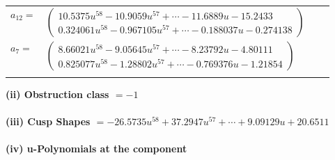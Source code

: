 \documentclass[1p]{elsarticle_modified}
\theoremstyle{definition}
\begin{document}
\begin{tabular}{m{7pt} m{180pt} m{7pt} m{180pt} }
\flushright $a_{12}=$&$\begin{pmatrix}10.5375 u^{58}-10.9059 u^{57}+\cdots-11.6889 u-15.2433\\0.324061 u^{58}-0.967105 u^{57}+\cdots-0.188037 u-0.274138\end{pmatrix}$ \\
\flushright $a_{7}=$&$\begin{pmatrix}8.66021 u^{58}-9.05645 u^{57}+\cdots-8.23792 u-4.80111\\0.825077 u^{58}-1.28802 u^{57}+\cdots-0.769376 u-1.21854\end{pmatrix}$\\&\end{tabular}
\flushleft \textbf{(ii) Obstruction class $= -1$}\\~\\
\flushleft \textbf{(iii) Cusp Shapes $= -26.5735 u^{58}+37.2947 u^{57}+\cdots+9.09129 u+20.6511$}\\~\\
\newpage\renewcommand{\arraystretch}{1}
\flushleft \textbf{(iv) u-Polynomials at the component}\newline \\
\end{document}

